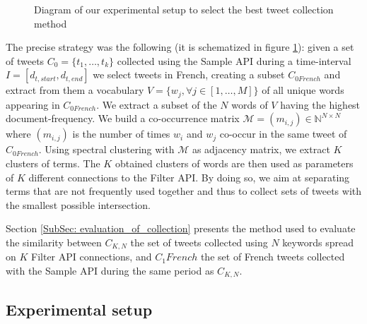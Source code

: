 \begin{figure}
\caption{Diagram of our experimental setup to select the best tweet collection method}
\label{Figure:ExperimentalSetup}
\end{figure}

The precise strategy was the following (it is schematized in figure \ref{Figure:ExperimentalSetup}): given a set of tweets $C_{0}=\{t_{1},\ldots, t_{k}\}$  collected using the Sample API during a time-interval $I = [d_{t,start}, d_{t,end}]$ we select tweets in French, creating a subset $C_{0 French}$ and extract from them a vocabulary $V = \{w_j, \forall j\in[1, \ldots,M]\}$ of all unique words appearing in $C_{0 French}$. We extract a subset of the $N$ words of $V$ having the highest document-frequency. We build a co-occurrence matrix $\mathcal{M} = (m_{i,j}) \in \mathbb{N}^{N\times N}$ where $(m_{i,j})$ is the number of times $w_i$ and $w_j$ co-occur in the same tweet of $C_{0 French}$. Using spectral clustering with $\mathcal{M}$ as adjacency matrix, we extract  $K$ clusters of terms. The $K$ obtained clusters of words are then used as parameters of $K$ different connections to the Filter API. By doing so, we aim at separating terms that are not frequently used together and thus to collect sets of tweets with the smallest possible intersection.


Section \ref{SubSec: evaluation_of_collection} presents the method used to evaluate the similarity between $C_{K,N}$ the set of tweets collected using $N$ keywords spread on $K$ Filter API connections, and $C_1 French$ the set of French tweets collected with the Sample API during the same period as $C_{K,N}$.

			\subsection{Experimental setup}

